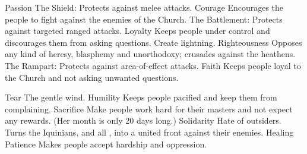 \begin{comment}
\subsubsection{\Shiram, the Passion}
\end{comment}
\begin{sephirahlist}{Passion}
\sephitem
  {\Barion}
  {\male}
  {The Shield: Protects against melee attacks.}
  {Courage}
  {Encourages the people to fight against the enemies of the Church.}
\sephitem
  {\Hoshied}
  {\male}
  {The Battlement: Protects against targeted ranged attacks.}
  {Loyalty}
  {Keeps people under control and discourages them from asking questions.}
\sephitem
  {\Razilah}
  {\male}
  {Create lightning.}
  {Righteousness}
  {Opposes any kind of heresy, blasphemy and unorthodoxy; crusades against the heathens.}
\sephitem
  {\Teshiron}
  {\female}
  {The Rampart: Protects against area-of-effect attacks.}
  {Faith}
  {Keeps people loyal to the Church and not asking unwanted questions.}
\end{sephirahlist}





\begin{comment}
\subsubsection{\Urisol, the Tear}
\end{comment}
\begin{sephirahlist}{Tear}
\sephitem
  {\Feazirah}
  {\female}
  {The gentle wind.}
  {Humility}
  {Keeps people pacified and keep them from complaining.}
\sephitem
  {\Gamishiel}
  {\female}
  {}
  {Sacrifice}
  {Make people work hard for their masters and not expect any rewards. (Her month is only 20 days long.)}
\sephitem
  {\Hapheron}
  {\male}
  {}
  {Solidarity}
  {Hate of outsiders. Turns the Iquinians, and all \humans, into a united front against their enemies.}
\sephitem
  {\Ishiel}
  {\female}
  {Healing}
  {Patience}
  {Makes people accept hardship and oppression.}
\end{sephirahlist}





